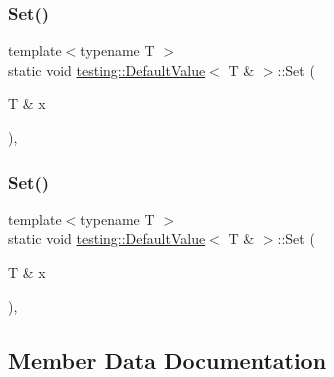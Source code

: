 \subsubsection{\texorpdfstring{Set()}{Set()}\hspace{0.1cm}{\footnotesize\ttfamily [2/3]}}
{\footnotesize\ttfamily template$<$typename T $>$ \\
static void \mbox{\hyperlink{classtesting_1_1_default_value}{testing\+::\+Default\+Value}}$<$ T \& $>$\+::Set (\begin{DoxyParamCaption}\item[{T \&}]{x }\end{DoxyParamCaption})\hspace{0.3cm}{\ttfamily [inline]}, {\ttfamily [static]}}

\mbox{\label{classtesting_1_1_default_value_3_01_t_01_6_01_4_a9863abf3d311ce5007d7e57dfce2f252}} 
\subsubsection{\texorpdfstring{Set()}{Set()}\hspace{0.1cm}{\footnotesize\ttfamily [3/3]}}
{\footnotesize\ttfamily template$<$typename T $>$ \\
static void \mbox{\hyperlink{classtesting_1_1_default_value}{testing\+::\+Default\+Value}}$<$ T \& $>$\+::Set (\begin{DoxyParamCaption}\item[{T \&}]{x }\end{DoxyParamCaption})\hspace{0.3cm}{\ttfamily [inline]}, {\ttfamily [static]}}



\subsection{Member Data Documentation}
\mbox{\label{classtesting_1_1_default_value_3_01_t_01_6_01_4_a49d846b827b1a35b60e2eaad98de5c04}} 
